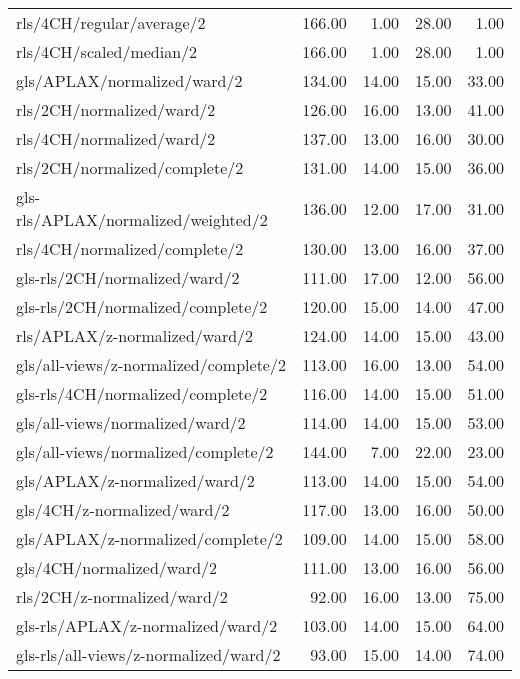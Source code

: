 \begin{longtable}{lrrrr}
    rls/4CH/regular/average/2                 & 166.00 &  1.00 & 28.00 &  1.00 \\
    rls/4CH/scaled/median/2                   & 166.00 &  1.00 & 28.00 &  1.00 \\
    gls/APLAX/normalized/ward/2               & 134.00 & 14.00 & 15.00 & 33.00 \\
    rls/2CH/normalized/ward/2                 & 126.00 & 16.00 & 13.00 & 41.00 \\
    rls/4CH/normalized/ward/2                 & 137.00 & 13.00 & 16.00 & 30.00 \\
    rls/2CH/normalized/complete/2             & 131.00 & 14.00 & 15.00 & 36.00 \\
    gls-rls/APLAX/normalized/weighted/2       & 136.00 & 12.00 & 17.00 & 31.00 \\
    rls/4CH/normalized/complete/2             & 130.00 & 13.00 & 16.00 & 37.00 \\
    gls-rls/2CH/normalized/ward/2             & 111.00 & 17.00 & 12.00 & 56.00 \\
    gls-rls/2CH/normalized/complete/2         & 120.00 & 15.00 & 14.00 & 47.00 \\
    rls/APLAX/z-normalized/ward/2             & 124.00 & 14.00 & 15.00 & 43.00 \\
    gls/all-views/z-normalized/complete/2     & 113.00 & 16.00 & 13.00 & 54.00 \\
    gls-rls/4CH/normalized/complete/2         & 116.00 & 14.00 & 15.00 & 51.00 \\
    gls/all-views/normalized/ward/2           & 114.00 & 14.00 & 15.00 & 53.00 \\
    gls/all-views/normalized/complete/2       & 144.00 &  7.00 & 22.00 & 23.00 \\
    gls/APLAX/z-normalized/ward/2             & 113.00 & 14.00 & 15.00 & 54.00 \\
    gls/4CH/z-normalized/ward/2               & 117.00 & 13.00 & 16.00 & 50.00 \\
    gls/APLAX/z-normalized/complete/2         & 109.00 & 14.00 & 15.00 & 58.00 \\
    gls/4CH/normalized/ward/2                 & 111.00 & 13.00 & 16.00 & 56.00 \\
    rls/2CH/z-normalized/ward/2               &  92.00 & 16.00 & 13.00 & 75.00 \\
    gls-rls/APLAX/z-normalized/ward/2         & 103.00 & 14.00 & 15.00 & 64.00 \\
    gls-rls/all-views/z-normalized/ward/2     &  93.00 & 15.00 & 14.00 & 74.00 \\

\end{longtable}
